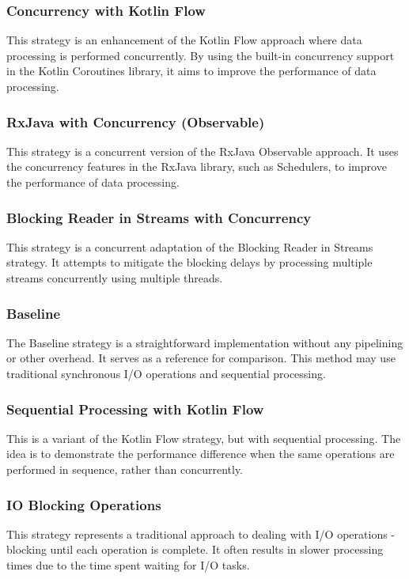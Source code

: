 \subsubsection{Concurrency with Kotlin Flow}
\label{subsubsec:concurrency_kotlin_flow}
This strategy is an enhancement of the Kotlin Flow approach where data processing is performed concurrently. By using the built-in concurrency support in the Kotlin Coroutines library, it aims to improve the performance of data processing.

\subsubsection{RxJava with Concurrency (Observable)}
\label{subsubsec:rxjava_concurrency_observable}
This strategy is a concurrent version of the RxJava Observable approach. It uses the concurrency features in the RxJava library, such as Schedulers, to improve the performance of data processing.

\subsubsection{Blocking Reader in Streams with Concurrency}
\label{subsubsec:blocking_reader_streams_concurrency}
This strategy is a concurrent adaptation of the Blocking Reader in Streams strategy. It attempts to mitigate the blocking delays by processing multiple streams concurrently using multiple threads.

\subsubsection{Baseline}
\label{subsubsec:baseline}
The Baseline strategy is a straightforward implementation without any pipelining or other overhead. It serves as a reference for comparison. This method may use traditional synchronous I/O operations and sequential processing.

\subsubsection{Sequential Processing with Kotlin Flow}
\label{subsubsec:sequential_processing_kotlin_flow}
This is a variant of the Kotlin Flow strategy, but with sequential processing. The idea is to demonstrate the performance difference when the same operations are performed in sequence, rather than concurrently.

\subsubsection{IO Blocking Operations}
\label{subsubsec:io_blocking_operations}
This strategy represents a traditional approach to dealing with I/O operations - blocking until each operation is complete. It often results in slower processing times due to the time spent waiting for I/O tasks.



